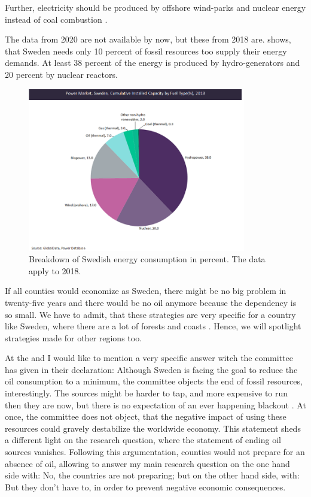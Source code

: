 Further, electricity should be produced by offshore wind-parks and nuclear energy instead of coal combustion \cite[14-15]{Sweden}.
\par
The data from 2020 are not available by now, but these from 2018 are. 
 shows, that Sweden needs only 10 percent of fossil resources too supply their energy demands.
At least 38 percent of the energy is produced by hydro-generators and 20 percent by nuclear reactors. 
\begin{figure}
  \centering
  \includegraphics[width=0.85\textwidth]{graphics/sweden_2018.png}
  \caption{Breakdown of Swedish energy consumption in percent. The data apply to 2018. \cite{sweden_2018}}
  \label{fig:sweden_2018}
\end{figure}
\par
If all counties would economize as Sweden, there might be no big problem in twenty-five years and there would be no oil anymore because the dependency is so small.
We have to admit, that these strategies are very specific for a country like Sweden, where there are a lot of forests and coasts \cite{Sweden}.
Hence, we will spotlight strategies made for other regions too.
\par
At the and I would like to mention a very specific answer witch the committee has given in their declaration:
Although Sweden is facing the goal to reduce the oil consumption to a minimum, the committee objects the end of fossil resources, interestingly.
The sources might be harder to tap, and more expensive to run then they are now, but there is no expectation of an ever happening blackout \cite[7]{Sweden}.
At once, the committee does not object, that the negative impact of using these resources could gravely destabilize the worldwide economy.
This statement sheds a different light on the research question, where the statement of ending oil sources vanishes. 
Following this argumentation, counties would not prepare for an absence of oil, allowing to answer my main research question on the one hand side with: 
No, the countries are not preparing; but on the other hand side, with: 
But they don't have to, in order to prevent negative economic consequences.  
\par

